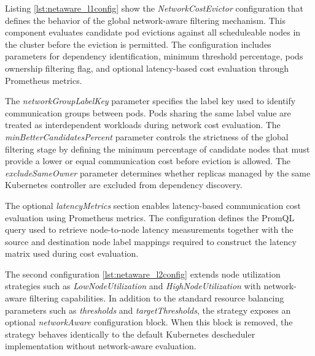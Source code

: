 \noindent\begin{minipage}{\linewidth}

\end{minipage}

Listing \ref{lst:netaware_l1config} show the \textit{NetworkCostEvictor} configuration that defines the behavior of the global network-aware filtering mechanism. This component evaluates candidate pod evictions against all scheduleable nodes in the cluster before the eviction is permitted. The configuration includes parameters for dependency identification, minimum threshold percentage, pods ownership filtering flag, and optional latency-based cost evaluation through Prometheus metrics.

The \textit{networkGroupLabelKey} parameter specifies the label key used to identify communication groups between pods. Pods sharing the same label value are treated as interdependent workloads during network cost evaluation. The \textit{minBetterCandidatesPercent} parameter controls the strictness of the global filtering stage by defining the minimum percentage of candidate nodes that must provide a lower or equal communication cost before eviction is allowed. The \textit{excludeSameOwner} parameter determines whether replicas managed by the same Kubernetes controller are excluded from dependency discovery.

The optional \textit{latencyMetrics} section enables latency-based communication cost evaluation using Prometheus metrics. The configuration defines the PromQL query used to retrieve node-to-node latency measurements together with the source and destination node label mappings required to construct the latency matrix used during cost evaluation.

\noindent\begin{minipage}{\linewidth}

\end{minipage}

The second configuration \ref{lst:netaware_l2config} extends node utilization strategies such as \textit{LowNodeUtilization} and \textit{HighNodeUtilization} with network-aware filtering capabilities. In addition to the standard resource balancing parameters such as \textit{thresholds} and \textit{targetThresholds}, the strategy exposes an optional \textit{networkAware} configuration block. When this block is removed, the strategy behaves identically to the default Kubernetes descheduler implementation without network-aware evaluation.

